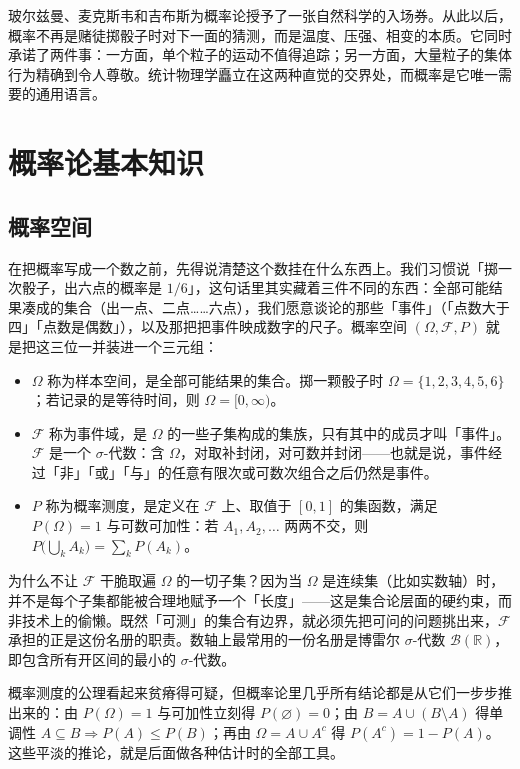 \documentclass[UTF8]{ctexbook}
\begin{document}
玻尔兹曼、麦克斯韦和吉布斯为概率论授予了一张自然科学的入场券。从此以后，概率不再是赌徒掷骰子时对下一面的猜测，而是温度、压强、相变的本质。它同时承诺了两件事：一方面，单个粒子的运动不值得追踪；另一方面，大量粒子的集体行为精确到令人尊敬。统计物理学矗立在这两种直觉的交界处，而概率是它唯一需要的通用语言。

\newpage
\section{概率论基本知识}
\subsection{概率空间}

在把概率写成一个数之前，先得说清楚这个数挂在什么东西上。我们习惯说「掷一次骰子，出六点的概率是 $1/6$」，这句话里其实藏着三件不同的东西：全部可能结果凑成的集合（出一点、二点……六点），我们愿意谈论的那些「事件」（「点数大于四」「点数是偶数」），以及那把把事件映成数字的尺子。概率空间 $(\Omega,\mathcal{F},P)$ 就是把这三位一并装进一个三元组：

\begin{itemize}
  \item $\Omega$ 称为样本空间，是全部可能结果的集合。掷一颗骰子时 $\Omega=\{1,2,3,4,5,6\}$；若记录的是等待时间，则 $\Omega=[0,\infty)$。
  \item $\mathcal{F}$ 称为事件域，是 $\Omega$ 的一些子集构成的集族，只有其中的成员才叫「事件」。$\mathcal{F}$ 是一个 $\sigma$-代数：含 $\Omega$，对取补封闭，对可数并封闭——也就是说，事件经过「非」「或」「与」的任意有限次或可数次组合之后仍然是事件。
  \item $P$ 称为概率测度，是定义在 $\mathcal{F}$ 上、取值于 $[0,1]$ 的集函数，满足 $P(\Omega)=1$ 与可数可加性：若 $A_1,A_2,\dots$ 两两不交，则 $P\bigl(\bigcup_k A_k\bigr)=\sum_k P(A_k)$。
\end{itemize}

为什么不让 $\mathcal{F}$ 干脆取遍 $\Omega$ 的一切子集？因为当 $\Omega$ 是连续集（比如实数轴）时，并不是每个子集都能被合理地赋予一个「长度」——这是集合论层面的硬约束，而非技术上的偷懒。既然「可测」的集合有边界，就必须先把可问的问题挑出来，$\mathcal{F}$ 承担的正是这份名册的职责。数轴上最常用的一份名册是博雷尔 $\sigma$-代数 $\mathcal{B}(\mathbb{R})$，即包含所有开区间的最小的 $\sigma$-代数。

概率测度的公理看起来贫瘠得可疑，但概率论里几乎所有结论都是从它们一步步推出来的：由 $P(\Omega)=1$ 与可加性立刻得 $P(\varnothing)=0$；由 $B=A\cup(B\setminus A)$ 得单调性 $A\subseteq B\Rightarrow P(A)\le P(B)$；再由 $\Omega=A\cup A^c$ 得 $P(A^c)=1-P(A)$。这些平淡的推论，就是后面做各种估计时的全部工具。
\end{document}
